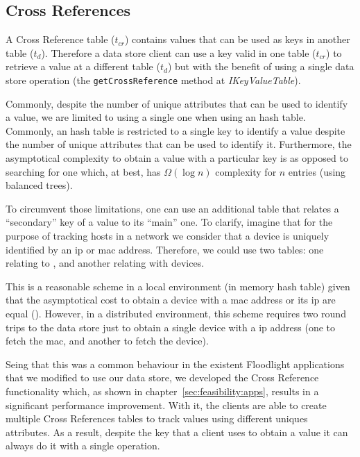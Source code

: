 \subsection{Cross References} 
\label{sec:heimdall:cross-references}
A Cross Reference table ($t_{cr}$) contains values that can be used as keys in another table ($t_{d}$). 
Therefore a data store client can use a key valid in  one table ($t_{cr}$) to retrieve a value at  a different table ($t_{d}$) but with the benefit of using a  single data store operation (the \texttt{getCrossReference} method at \emph{IKeyValueTable}). 

Commonly, despite the number of unique attributes that can be used to identify a value, we are limited to using a single one when using an hash table. 
Commonly, an hash table is restricted to a single key to identify a value despite the  number of unique attributes  that can be used to identify it. 
Furthermore, the asymptotical complexity to obtain a value with a particular key is  as opposed to searching for one which, at best, has $\Omega(\log n)$ complexity for $n$ entries (using balanced trees). 

To circumvent those limitations, one can use an additional table that relates a ``secondary'' key of a value to its ``main'' one. 
To clarify, imagine that for the purpose of tracking hosts in a network we consider that a device is uniquely identified by an \gls{ip} or \gls{mac} address. 
Therefore, we could use two tables: one relating  to  , and another relating  with devices.

This is a reasonable scheme in a local environment (in memory hash table) given that the asymptotical cost to obtain a device with 
a \gls{mac} address or its \gls{ip}  are equal (). 
However, in a distributed environment, this scheme requires two round trips to the data store just to obtain a single device with a \gls{ip} address (one to fetch the \gls{mac}, and another to fetch the device). 

Seing that this was a common behaviour in the existent Floodlight applications that we modified to use our data store, we developed the Cross Reference functionality which, as shown in chapter~\ref{sec:feasibility:apps}, results in a significant performance improvement. 
With it, the clients are able to create multiple Cross References tables to track values using different uniques attributes. 
As a result, despite the key that a client uses to obtain a value it can always do it with a single operation. 


